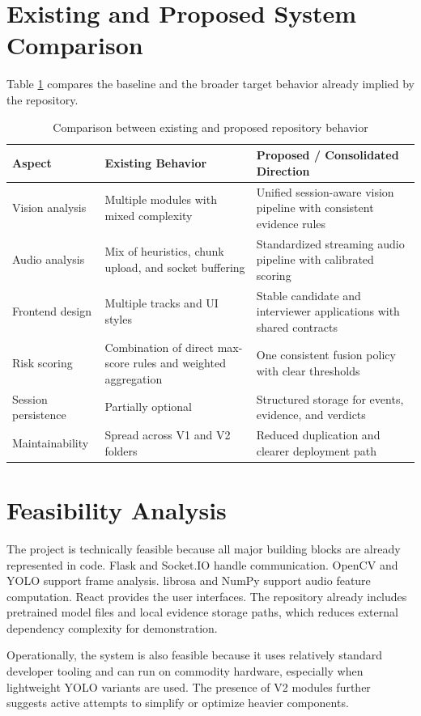 \documentclass[12pt,a4paper]{extreport}
\begin{document}
\section{Existing and Proposed System Comparison}
Table \ref{tab:existing_proposed} compares the baseline and the broader target behavior already implied by the repository.

\begin{table}[H]
\centering
\caption{Comparison between existing and proposed repository behavior}
\label{tab:existing_proposed}
\begin{tabularx}{\textwidth}{p{4.1cm}p{4.2cm}X}
\toprule
\textbf{Aspect} & \textbf{Existing Behavior} & \textbf{Proposed / Consolidated Direction}\\
\midrule
Vision analysis & Multiple modules with mixed complexity & Unified session-aware vision pipeline with consistent evidence rules\\
Audio analysis & Mix of heuristics, chunk upload, and socket buffering & Standardized streaming audio pipeline with calibrated scoring\\
Frontend design & Multiple tracks and UI styles & Stable candidate and interviewer applications with shared contracts\\
Risk scoring & Combination of direct max-score rules and weighted aggregation & One consistent fusion policy with clear thresholds\\
Session persistence & Partially optional & Structured storage for events, evidence, and verdicts\\
Maintainability & Spread across V1 and V2 folders & Reduced duplication and clearer deployment path\\
\bottomrule
\end{tabularx}
\end{table}

\section{Feasibility Analysis}
The project is technically feasible because all major building blocks are already represented in code. Flask and Socket.IO handle communication. OpenCV and YOLO support frame analysis. librosa and NumPy support audio feature computation. React provides the user interfaces. The repository already includes pretrained model files and local evidence storage paths, which reduces external dependency complexity for demonstration.

Operationally, the system is also feasible because it uses relatively standard developer tooling and can run on commodity hardware, especially when lightweight YOLO variants are used. The presence of V2 modules further suggests active attempts to simplify or optimize heavier components.
\end{document}

